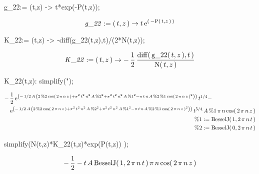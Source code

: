 \begin{mapleinput}
g_22:= (t,z) -> t*exp(-P(t,z));
\end{mapleinput}
\begin{maplelatex}
\[
{\it g\_22} := (\,{t}, {z}\,) \rightarrow {t}\,{\rm e}^{(\, - 
{\rm P}(\,{t}, {z}\,)\,)}
\]
\end{maplelatex}
\begin{mapleinput}
K_22:= (t,z) -> -diff(g_22(t,z),t)/(2*N(t,z));
\end{mapleinput}
\begin{maplelatex}
\[
{\it K\_22} := (\,{t}, {z}\,) \rightarrow  - \,{\displaystyle 
\frac {1}{2}}\,{\displaystyle \frac {{\rm diff}(\,{\rm g\_22}(\,{
t}, {z}\,), {t}\,)}{{\rm N}(\,{t}, {z}\,)}}
\]
\end{maplelatex}
\begin{mapleinput}
K_22(t,z): simplify(");
\end{mapleinput}
\begin{maplelatex}
\begin{eqnarray*}
\lefteqn{ - \,{\displaystyle \frac {1}{2}}\,{\rm e}^{ \left( \! 
\, - \,1/2\,{A}\, \left( \! \,2\,{\rm \%2}\,{\rm cos}(\,2\,{ \pi}
\,{n}\,{z}\,) + { \pi}^{2}\,{t}^{2}\,{n}^{2}\,{A}\,{\rm \%2}^{2}
 + { \pi}^{2}\,{t}^{2}\,{n}^{2}\,{A}\,{\rm \%1}^{2} - { \pi}\,{t}
\,{n}\,{A}\,{\rm \%2}\,{\rm \%1}\,{\rm cos}(\,2\,{ \pi}\,{n}\,{z}
\,)^{2}\, \!  \right) \, \!  \right) }\,{t}^{1/4} - } \\
 & & {\rm e}^{ \left( \! \, - \,1/2\,{A}\, \left( \! \,2\,{\rm 
\%2}\,{\rm cos}(\,2\,{ \pi}\,{n}\,{z}\,) + { \pi}^{2}\,{t}^{2}\,{
n}^{2}\,{A}\,{\rm \%2}^{2} + { \pi}^{2}\,{t}^{2}\,{n}^{2}\,{A}\,
{\rm \%1}^{2} - { \pi}\,{t}\,{n}\,{A}\,{\rm \%2}\,{\rm \%1}\,
{\rm cos}(\,2\,{ \pi}\,{n}\,{z}\,)^{2}\, \!  \right) \, \! 
 \right) }\,{t}^{5/4}\,{A}\,{\rm \%1}\,{ \pi}\,{n}\,{\rm cos}(\,2
\,{ \pi}\,{n}\,{z}\,) \\
 & & {\rm \%1} := {\rm BesselJ}(\,1, 2\,{ \pi}\,{n}\,{t}\,) \\
 & & {\rm \%2} := {\rm BesselJ}(\,0, 2\,{ \pi}\,{n}\,{t}\,)
\end{eqnarray*}
\end{maplelatex}
\begin{mapleinput}
simplify(N(t,z)*K_22(t,z)*exp(P(t,z)) );
\end{mapleinput}
\begin{maplelatex}
\[
 - \,{\displaystyle \frac {1}{2}} - {t}\,{A}\,{\rm BesselJ}(\,1, 
2\,{ \pi}\,{n}\,{t}\,)\,{ \pi}\,{n}\,{\rm cos}(\,2\,{ \pi}\,{n}\,
{z}\,)
\]
\end{maplelatex}
